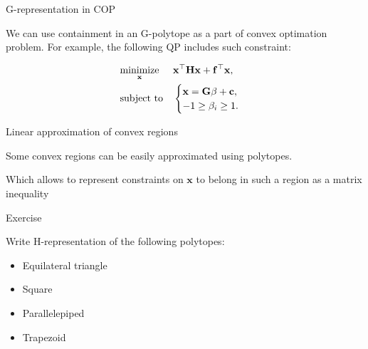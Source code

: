 \documentclass{beamer}
\begin{document}
\begin{frame}{G-representation in COP}
	\begin{flushleft}
		
		We can use containment in an G-polytope as a part of convex optimation problem. For example, the following QP includes such constraint:
		
		\begin{equation}
			\begin{aligned}
				& \underset{\mathbf{x}}{\text{minimize}}
				& & \mathbf{x}^\top \mathbf{H} \mathbf{x} + \mathbf{f}^\top\mathbf{x}, \\
				& \text{subject to}
				& & \begin{cases}
					\mathbf{x} = \mathbf{G}\beta+\mathbf{c}, \\
					-1 \geq \beta_i \geq 1.
				\end{cases}
			\end{aligned}
		\end{equation}
		
	\end{flushleft}
\end{frame}




\begin{frame}{Linear approximation of convex regions}
\begin{flushleft}
Some convex regions can be easily approximated using polytopes.



Which allows to represent constraints on $\mathbf{x}$ to belong in such a region as a matrix inequality
 
\end{flushleft}
\end{frame}



\begin{frame}{Exercise}
\begin{flushleft}

Write H-representation of the following polytopes:

\begin{itemize}
    \item Equilateral triangle
    \item Square
    \item Parallelepiped
    \item Trapezoid
\end{itemize}

\end{flushleft}
\end{frame}





\myqrframe
\end{document}
